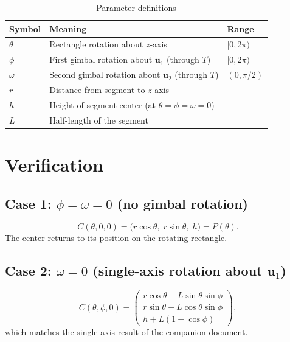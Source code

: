 \documentclass[12pt,a4paper]{article}
\newcommand{\uva}{\mathbf{u}_1}
\newcommand{\uvb}{\mathbf{u}_2}
\begin{document}
\begin{table}[htbp]
  \centering
  \caption{Parameter definitions}
  \begin{tabular}{@{}lll@{}}
    \toprule
    Symbol      & Meaning                                          & Range \\
    \midrule
    $\theta$    & Rectangle rotation about $z$-axis                & $[0,2\pi)$ \\
    $\phi$      & First gimbal rotation about $\uva$ (through $T$) & $[0,2\pi)$ \\
    $\omega$    & Second gimbal rotation about $\uvb$ (through $T$) & $(0,\pi/2)$ \\
    $r$         & Distance from segment to $z$-axis                 & \\
    $h$         & Height of segment center (at $\theta=\phi=\omega=0$) & \\
    $L$         & Half-length of the segment                        & \\
    \bottomrule
  \end{tabular}
\end{table}

\section{Verification}\label{sec:verify}

\subsection*{Case 1: $\phi = \omega = 0$ (no gimbal rotation)}

\[
C(\theta,0,0) = \big( r\cos\theta,\; r\sin\theta,\; h \big) = P(\theta).
\]
The center returns to its position on the rotating rectangle. 

\subsection*{Case 2: $\omega = 0$ (single-axis rotation about $\uva$)}

\[
C(\theta,\phi,0) = \begin{pmatrix}
    r\cos\theta - L\sin\theta\sin\phi \\
    r\sin\theta + L\cos\theta\sin\phi \\
    h + L(1-\cos\phi)
  \end{pmatrix},
\]
which matches the single-axis result of the companion document. 
\end{document}
